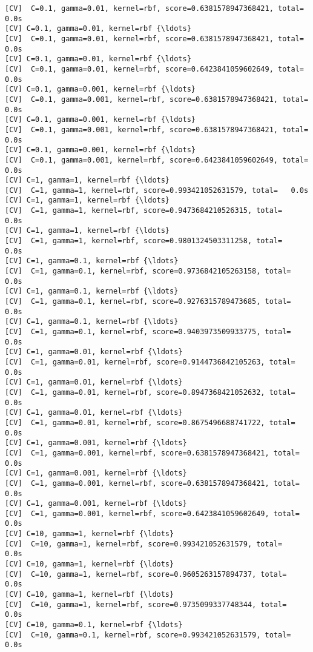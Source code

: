 \documentclass[11pt]{article}
\begin{document}
    \begin{Verbatim}[commandchars=\\\{\}]
[CV]  C=0.1, gamma=0.01, kernel=rbf, score=0.6381578947368421, total=   0.0s
[CV] C=0.1, gamma=0.01, kernel=rbf {\ldots}
[CV]  C=0.1, gamma=0.01, kernel=rbf, score=0.6381578947368421, total=   0.0s
[CV] C=0.1, gamma=0.01, kernel=rbf {\ldots}
[CV]  C=0.1, gamma=0.01, kernel=rbf, score=0.6423841059602649, total=   0.0s
[CV] C=0.1, gamma=0.001, kernel=rbf {\ldots}
[CV]  C=0.1, gamma=0.001, kernel=rbf, score=0.6381578947368421, total=   0.0s
[CV] C=0.1, gamma=0.001, kernel=rbf {\ldots}
[CV]  C=0.1, gamma=0.001, kernel=rbf, score=0.6381578947368421, total=   0.0s
[CV] C=0.1, gamma=0.001, kernel=rbf {\ldots}
[CV]  C=0.1, gamma=0.001, kernel=rbf, score=0.6423841059602649, total=   0.0s
[CV] C=1, gamma=1, kernel=rbf {\ldots}
[CV]  C=1, gamma=1, kernel=rbf, score=0.993421052631579, total=   0.0s
[CV] C=1, gamma=1, kernel=rbf {\ldots}
[CV]  C=1, gamma=1, kernel=rbf, score=0.9473684210526315, total=   0.0s
[CV] C=1, gamma=1, kernel=rbf {\ldots}
[CV]  C=1, gamma=1, kernel=rbf, score=0.9801324503311258, total=   0.0s
[CV] C=1, gamma=0.1, kernel=rbf {\ldots}
[CV]  C=1, gamma=0.1, kernel=rbf, score=0.9736842105263158, total=   0.0s
[CV] C=1, gamma=0.1, kernel=rbf {\ldots}
[CV]  C=1, gamma=0.1, kernel=rbf, score=0.9276315789473685, total=   0.0s
[CV] C=1, gamma=0.1, kernel=rbf {\ldots}
[CV]  C=1, gamma=0.1, kernel=rbf, score=0.9403973509933775, total=   0.0s
[CV] C=1, gamma=0.01, kernel=rbf {\ldots}
[CV]  C=1, gamma=0.01, kernel=rbf, score=0.9144736842105263, total=   0.0s
[CV] C=1, gamma=0.01, kernel=rbf {\ldots}
[CV]  C=1, gamma=0.01, kernel=rbf, score=0.8947368421052632, total=   0.0s
[CV] C=1, gamma=0.01, kernel=rbf {\ldots}
[CV]  C=1, gamma=0.01, kernel=rbf, score=0.8675496688741722, total=   0.0s
[CV] C=1, gamma=0.001, kernel=rbf {\ldots}
[CV]  C=1, gamma=0.001, kernel=rbf, score=0.6381578947368421, total=   0.0s
[CV] C=1, gamma=0.001, kernel=rbf {\ldots}
[CV]  C=1, gamma=0.001, kernel=rbf, score=0.6381578947368421, total=   0.0s
[CV] C=1, gamma=0.001, kernel=rbf {\ldots}
[CV]  C=1, gamma=0.001, kernel=rbf, score=0.6423841059602649, total=   0.0s
[CV] C=10, gamma=1, kernel=rbf {\ldots}
[CV]  C=10, gamma=1, kernel=rbf, score=0.993421052631579, total=   0.0s
[CV] C=10, gamma=1, kernel=rbf {\ldots}
[CV]  C=10, gamma=1, kernel=rbf, score=0.9605263157894737, total=   0.0s
[CV] C=10, gamma=1, kernel=rbf {\ldots}
[CV]  C=10, gamma=1, kernel=rbf, score=0.9735099337748344, total=   0.0s
[CV] C=10, gamma=0.1, kernel=rbf {\ldots}
[CV]  C=10, gamma=0.1, kernel=rbf, score=0.993421052631579, total=   0.0s

\end{Verbatim}
\end{document}
